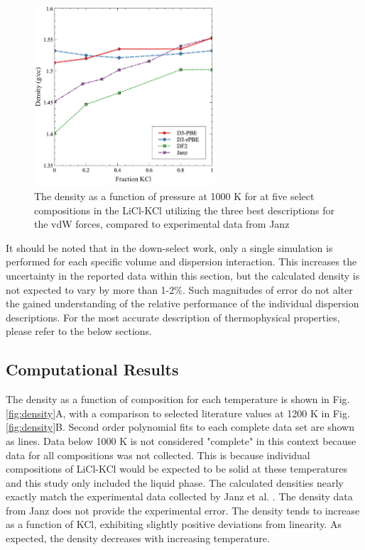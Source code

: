 \documentclass[review]{elsarticle}
\begin{document}
\begin{figure}[h]
 \centering
 \includegraphics[width=0.6\textwidth]{images/final_disp.jpg} 
 \caption{The density as a function of pressure at 1000 K for at five select compositions in the LiCl-KCl utilizing the three best descriptions for the vdW forces, compared to experimental data from Janz \cite{janz1975molten,van1955electrical}}
 \label{fig:disp_tot}
\end{figure} 

It should be noted that in the down-select work, only a single simulation is performed for each specific volume and dispersion interaction. This increases the uncertainty in the reported data within this section, but the calculated density is not expected to vary by more than 1-2\%. Such magnitudes of error do not alter the gained understanding of the relative performance of the individual dispersion descriptions. For the most accurate description of thermophysical properties, please refer to the below sections. 

\FloatBarrier

\subsection{Computational Results}

The density as a function of composition for each temperature is shown in Fig. \ref{fig:density}A, with a comparison to selected literature values at 1200 K in Fig. \ref{fig:density}B. Second order polynomial fits to each complete data set are shown as lines. Data below 1000 K is not considered "complete" in this context because data for all compositions was not collected. This is because individual compositions of LiCl-KCl would be expected to be solid at these temperatures and this study only included the liquid phase. The calculated densities nearly exactly match the experimental data collected by Janz et al. \cite{janz1975molten,van1955electrical}. The density data from Janz does not provide the experimental error. The density tends to increase as a function of KCl, exhibiting slightly positive deviations from linearity. As expected, the density decreases with increasing temperature.  
\end{document}
